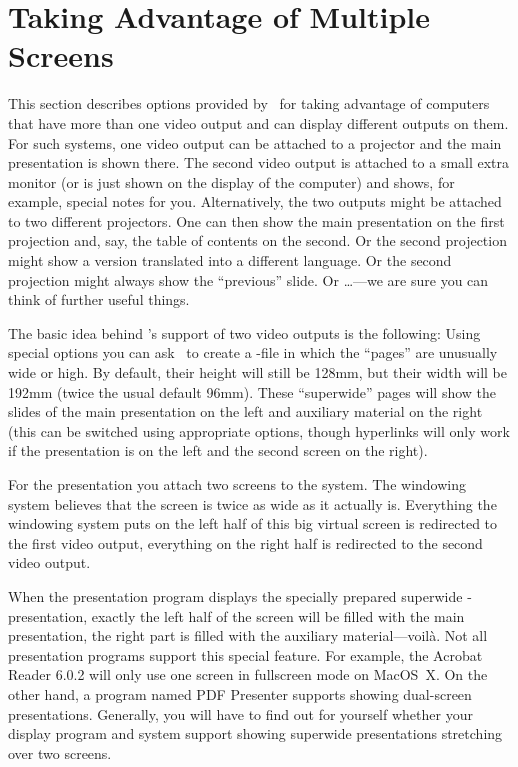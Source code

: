 %
%
%

\section{Taking Advantage of Multiple Screens}
\label{section-twoscreens}

This section describes options provided by \beamer\ for taking advantage of computers that have more than one video output and can display different outputs on them. For such systems, one video output can be attached to a projector and the main presentation is shown there. The second video output is attached to a small extra monitor (or is just shown on the display of the computer) and shows, for example, special notes for you. Alternatively, the two outputs might be attached to two different projectors. One can then show the main presentation on the first projection and, say, the table of contents on the second. Or the second projection might show a version translated into a different language. Or the second projection might always show the ``previous'' slide. Or \ldots---we are sure you can think of further useful things.

The basic idea behind \beamer's support of two video outputs is the following: Using special options you can ask \beamer\ to create a \pdf-file in which the ``pages'' are unusually wide or high. By default, their height will still be 128mm, but their width will be 192mm (twice the usual default 96mm). These ``superwide'' pages will show the slides of the main presentation on the left and auxiliary material on the right (this can be switched using appropriate options, though hyperlinks will only work if the presentation is on the left and the second screen on the right).

For the presentation you attach two screens to the system. The windowing system believes that the screen is twice as wide as it actually is. Everything the windowing system puts on the left half of this big virtual screen is redirected to the first video output, everything on the right half is redirected to the second video output.

When the presentation program displays the specially prepared superwide \beamer-presentation, exactly the left half of the screen will be filled with the main presentation, the right part is filled with the auxiliary material---voil\`a. Not all presentation programs support this special feature. For example, the Acrobat Reader 6.0.2 will only use one screen in fullscreen mode on MacOS~X. On the other hand, a program named PDF Presenter supports showing dual-screen presentations. Generally, you will have to find out for yourself whether your display program and system support showing superwide presentations stretching over two screens.

